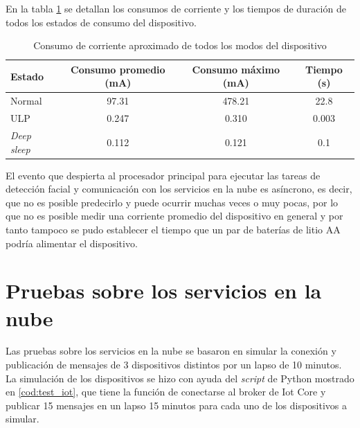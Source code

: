 En la tabla \ref{tab:test_ulp} se detallan los consumos de corriente y los tiempos de duración de todos los estados de consumo del dispositivo.

\begin{table}[h]
	\centering
	\caption[Consumo de corriente del dispositivo]{Consumo de corriente aproximado de todos los modos del dispositivo}
	\begin{tabular}{lccc}   
		\toprule
		\textbf{Estado} & \textbf{Consumo promedio (mA)} & \textbf{Consumo máximo (mA)} & \textbf{Tiempo (s)} \\
		\midrule
		Normal & 97.31 & 478.21 & 22.8 \\
		ULP & 0.247 & 0.310 & 0.003 \\
		\textit{Deep sleep} & 0.112 & 0.121 & 0.1 \\
		\bottomrule
		\hline
	\end{tabular}
	\label{tab:test_ulp}
\end{table}

El evento que despierta al procesador principal para ejecutar las tareas de detección facial y comunicación con los servicios en la nube es asíncrono, es decir, que no es posible predecirlo y puede ocurrir muchas veces o muy pocas, por lo que no es posible medir una corriente promedio del dispositivo en general y por tanto tampoco se pudo establecer el tiempo que un par de baterías de litio AA podría alimentar el dispositivo.

\section{Pruebas sobre los servicios en la nube}
Las pruebas sobre los servicios en la nube se basaron en simular la conexión y publicación de mensajes de 3 dispositivos distintos por un lapso de 10 minutos. La simulación de los dispositivos se hizo con ayuda del \textit{script} de Python mostrado en \ref{cod:test_iot}, que tiene la función de conectarse al broker de Iot Core y publicar 15 mensajes en un lapso 15 minutos para cada uno de los dispositivos a simular.

